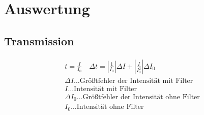 \documentclass[a4paper]{article}
\begin{document}
\section{Auswertung}
\subsection{Transmission}
\begin{align}
				t=\frac{I}{I_0} \quad  \Delta t = \left|\frac{1}{I_0}\right|\Delta I + \left| \frac{I}{I_0^2} \right| \Delta I_0 \\
				\Delta I\dots \text{Größtfehler der Intensität mit Filter}\\
				I\dots \text{Intensität mit Filter}\\
				\Delta I_0\dots \text{Größtfehler der Intensität ohne Filter}\\
				I_0\dots \text{Intensität ohne Filter}
				\label{trans}
\end{align}
\end{document}
